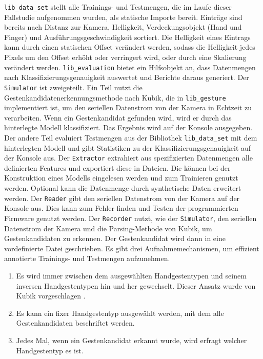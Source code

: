 \texttt{lib\_data\_set} stellt alle Trainings- und Testmengen, die im Laufe dieser Fallstudie aufgenommen wurden, als statische Importe bereit. Einträge sind bereits nach Distanz zur Kamera,
Helligkeit, Verdeckungsobjekt (Hand und Finger) und Ausführungsgeschwindigkeit sortiert. Die Helligkeit eines Eintrags kann durch einen statischen Offset verändert werden, sodass die Helligkeit jedes
Pixels um den Offset erhöht oder verringert wird, oder durch eine Skalierung verändert werden.
\newline
\newline
\texttt{lib\_evaluation} bietet ein Hilfsobjekt an, dass Datenmengen nach Klassifizierungsgenauigkeit auswertet und Berichte daraus generiert.
\newline
\newline
Der \texttt{Simulator} ist zweigeteilt. Ein Teil nutzt die Gestenkandidatenerkennungsmethode nach Kubik, die in \texttt{lib\_gesture} implementiert ist, um den seriellen Datenstrom von der Kamera in
Echtzeit zu verarbeiten. Wenn ein Gestenkandidat gefunden wird, wird er durch das hinterlegte Modell klassifiziert. Das Ergebnis wird auf der Konsole ausgegeben. Der andere Teil evaluiert
Testmengen aus der Bibliothek \texttt{lib\_data\_set} mit dem hinterlegten Modell und gibt Statistiken zu der Klassifizierungsgenauigkeit auf der Konsole aus.
\newline
\newline
Der \texttt{Extractor} extrahiert aus spezifizierten Datenmengen alle definierten Features und exportiert diese in Dateien. Die können bei der Konstruktion eines Modells eingelesen werden und zum Trainieren
genutzt werden. Optional kann die Datenmenge durch synthetische Daten erweitert werden.
\newline
\newline
Der \texttt{Reader} gibt den seriellen Datenstrom von der Kamera auf der Konsole aus. Dies kann zum Fehler finden und Testen der programmierten Firmware genutzt werden.
\newline
\newline
Der \texttt{Recorder} nutzt, wie der \texttt{Simulator}, den seriellen Datenstrom der Kamera und die Parsing-Methode von Kubik, um Gestenkandidaten zu erkennen.
Der Gestenkandidat wird dann in eine vordefinierte Datei geschrieben. Es gibt drei Aufnahmemechanismen, um effizient annotierte Trainings- und Testmengen aufzunehmen.
\newpage
\begin{enumerate}
    \item Es wird immer zwischen dem ausgewählten Handgestentypen und seinem inversen Handgestentypen hin und her gewechselt. Dieser Ansatz wurde von Kubik vorgeschlagen \cite{venzkeArticle}.
    \item Es kann ein fixer Handgestentyp ausgewählt werden, mit dem alle Gestenkandidaten beschriftet werden.
    \item Jedes Mal, wenn ein Gestenkandidat erkannt wurde, wird erfragt welcher Handgestentyp es ist.
\end{enumerate}